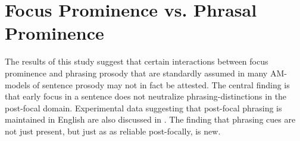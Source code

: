 \documentclass[preprint,review,12pt,authoryear,times]{elsarticle}
\begin{document}

\section{Focus Prominence vs. Phrasal Prominence}

The results of this study suggest that certain interactions between focus prominence and phrasing prosody that are standardly assumed in many AM-models of sentence prosody may not in fact be attested. The central finding is that early focus in a sentence does not neutralize phrasing-distinctions in the post-focal domain. Experimental data suggesting that post-focal phrasing is maintained in English are also discussed in \citet{norcl05} \citep[and][for other languages]{jun00, sugah03, ishih03, ishih16, kugle17}.  The finding that phrasing cues are not just present, but just as as reliable post-focally, is new.  
\end{document}
